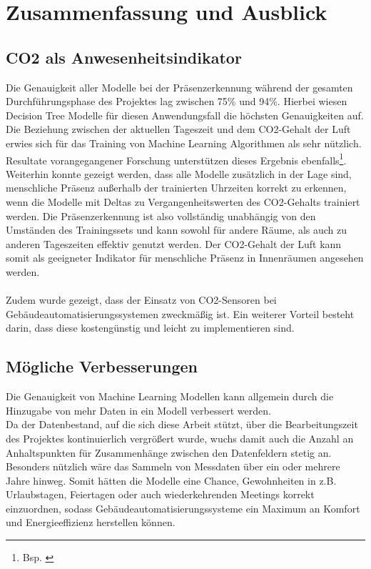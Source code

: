 \clearpage
\chapter{\textbf{Zusammenfassung und Ausblick}}\label{zusammenfassung}

\section{CO2 als Anwesenheitsindikator}
Die Genauigkeit aller Modelle bei der Präsenzerkennung während der gesamten Durchführungsphase des Projektes 
lag zwischen 75\% und 94\%.
Hierbei wiesen Decision Tree Modelle für diesen Anwendungsfall die höchsten Genauigkeiten auf. 
Die Beziehung zwischen der aktuellen Tageszeit und dem CO2-Gehalt der Luft erwies sich für das Training von 
Machine Learning Algorithmen als sehr nützlich. 
Resultate vorangegangener Forschung unterstützen dieses Ergebnis ebenfalls\footnote[1]{Bsp. \cite{IPPR}}.\\
Weiterhin konnte gezeigt werden, dass alle Modelle zusätzlich in der Lage sind, menschliche Präsenz außerhalb
der trainierten Uhrzeiten korrekt zu erkennen, wenn die Modelle mit Deltas zu Vergangenheitswerten des 
CO2-Gehalts trainiert werden. Die Präsenzerkennung ist also vollständig unabhängig von den Umständen des
Trainingssets und kann sowohl für andere Räume, als auch zu anderen Tageszeiten effektiv genutzt werden. 
Der CO2-Gehalt der Luft kann somit als geeigneter Indikator für menschliche Präsenz in Innenräumen angesehen 
werden.\\\\
Zudem wurde gezeigt, dass der Einsatz von CO2-Sensoren bei Gebäudeautomatisierungssystemen zweckmäßig ist.
Ein weiterer Vorteil besteht darin, dass diese kostengünstig und leicht zu implementieren sind.


\section{Mögliche Verbesserungen}
Die Genauigkeit von Machine Learning Modellen kann allgemein durch die Hinzugabe von mehr Daten in ein Modell 
verbessert werden. \\
Da der Datenbestand, auf die sich diese Arbeit stützt, über die Bearbeitungszeit des Projektes 
kontinuierlich vergrößert wurde, wuchs damit auch die Anzahl an Anhaltspunkten für Zusammenhänge zwischen den 
Datenfeldern stetig an. Besonders nützlich wäre das Sammeln von Messdaten über ein oder mehrere Jahre hinweg.
Somit hätten die Modelle eine Chance, Gewohnheiten in z.B. Urlaubstagen, Feiertagen oder auch wiederkehrenden
Meetings korrekt einzuordnen, sodass Gebäudeautomatisierungssysteme ein Maximum an Komfort und Energieeffizienz
herstellen können.

